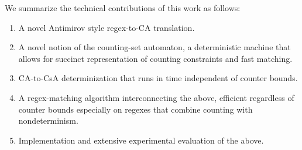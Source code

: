\documentclass[acmsmall,screen]{acmart}
\begin{document}
We summarize the technical contributions of this work as follows:
\begin{enumerate}
\item A novel Antimirov style regex-to-CA translation.
\item A novel notion of the counting-set automaton, a deterministic machine that
allows for succinct representation of counting constraints and fast matching.
\item CA-to-CsA determinization that runs in time independent of counter bounds.
\item A regex-matching algorithm interconnecting the above, efficient regardless
  of counter bounds  especially on regexes that combine counting with nondeterminism.
\item Implementation and extensive experimental evaluation of the above.
\end{enumerate}
\end{document}
